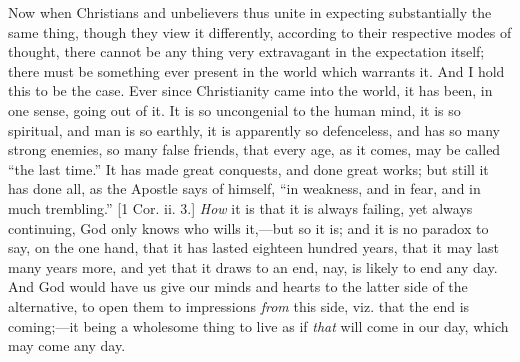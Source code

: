 Now when Christians and unbelievers thus unite in expecting
substantially the same thing, though they view it differently,
according to their respective modes of thought, there cannot be any
thing very extravagant in the expectation itself; there must be
something ever present in the world which warrants it. And I hold this
to be the case. Ever since Christianity came into the world, it has
been, in one sense, going out of it. It is so uncongenial to the human
mind, it is so spiritual, and man is so earthly, it is apparently so
defenceless, and has so many strong enemies, so many false friends,
that every age, as it comes, may be called ``the last time.''
It has made great conquests, and done great works; but still it has
done all, as the Apostle says of himself, ``in weakness, and in
fear, and in much trembling.'' [1 Cor. ii. 3.] \emph{How} it is
that it is always failing, yet always continuing, God only knows who
wills it,—but so it is; and it is no paradox to say, on the one
hand, that it has lasted eighteen hundred years, that it may last many
years more, and yet that it draws to an end, nay, is likely to end any
day. And God would have us give our minds and hearts to the latter
side of the alternative, to open them to impressions \emph{from} this
side, viz. that the end is coming;—it being a wholesome thing to
live as if \emph{that} will come in our day, which may come any day.


